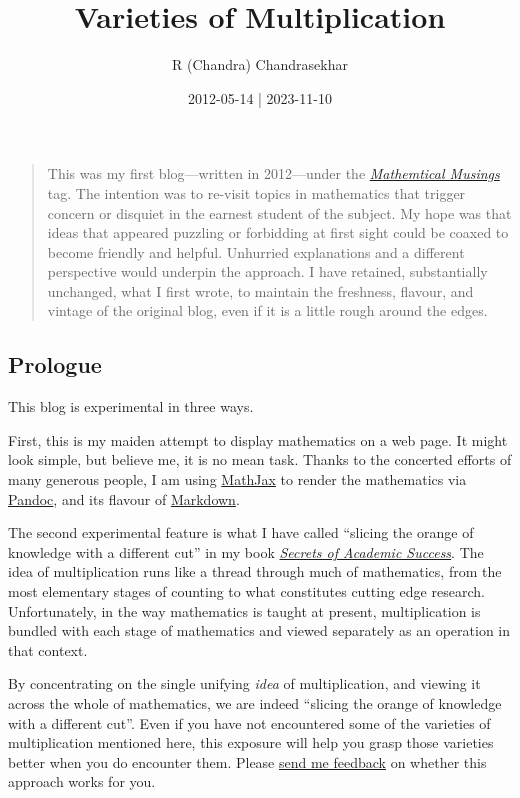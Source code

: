 \documentclass[
  a4paper,
]{article}
\title{Varieties of Multiplication}
\author{R (Chandra) Chandrasekhar}
\date{2012-05-14 | 2023-11-10}
\begin{document}
\maketitle

\thispagestyle{empty}


\begin{quote}
This was my first blog---written in 2012---under the
\href{https://swanlotus.netlify.app/tag/mathematical-musings}{\emph{Mathemtical
Musings}} tag. The intention was to re-visit topics in mathematics that
trigger concern or disquiet in the earnest student of the subject. My
hope was that ideas that appeared puzzling or forbidding at first sight
could be coaxed to become friendly and helpful. Unhurried explanations
and a different perspective would underpin the approach. I have
retained, substantially unchanged, what I first wrote, to maintain the
freshness, flavour, and vintage of the original blog, even if it is a
little rough around the edges.
\end{quote}

\hypertarget{prologue}{%
\subsection{Prologue}\label{prologue}}

This blog is experimental in three ways.

First, this is my maiden attempt to display mathematics on a web page.
It might look simple, but believe me, it is no mean task. Thanks to the
concerted efforts of many generous people, I am using
\href{https://www.mathjax.org/}{MathJax} to render the mathematics via
\href{https://pandoc.org/}{Pandoc}, and its flavour of
\href{https://garrettgman.github.io/rmarkdown/authoring_pandoc_markdown.html}{Markdown}.

The second experimental feature is what I have called ``slicing the
orange of knowledge with a different cut'' in my book
\href{https://swanlotus.netlify.app/sas}{\emph{Secrets of Academic
Success}}. The idea of multiplication runs like a thread through much of
mathematics, from the most elementary stages of counting to what
constitutes cutting edge research. Unfortunately, in the way mathematics
is taught at present, multiplication is bundled with each stage of
mathematics and viewed separately as an operation in that context.

By concentrating on the single unifying \emph{idea} of multiplication,
and viewing it across the whole of mathematics, we are indeed ``slicing
the orange of knowledge with a different cut''. Even if you have not
encountered some of the varieties of multiplication mentioned here, this
exposure will help you grasp those varieties better when you do
encounter them. Please \href{mailto:feedback.swanlotus@gmail.com}{send
me feedback} on whether this approach works for you.
\end{document}
